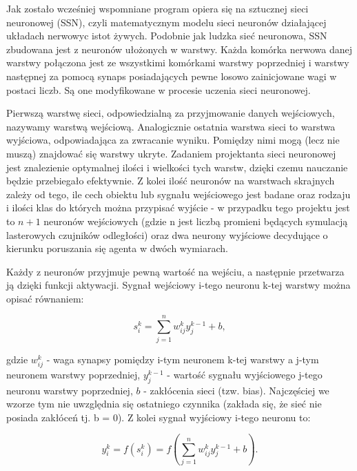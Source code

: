 \documentclass[12pt,a4paper]{article}
\begin{document}
\hspace{20pt} Jak zostało wcześniej wspomniane program opiera się na sztucznej sieci neuronowej (SSN), czyli matematycznym modelu sieci neuronów działającej układach nerwowyc istot żywych. Podobnie jak ludzka sieć neuronowa, SSN zbudowana jest z neuronów ułożonych w warstwy. Każda komórka nerwowa danej warstwy połączona jest ze wszystkimi komórkami warstwy poprzedniej i warstwy następnej za pomocą synaps posiadających pewne losowo zainicjowane wagi w postaci liczb. Są one modyfikowane w procesie uczenia sieci neuronowej.

\vspace{5pt}
Pierwszą warstwę sieci, odpowiedzialną za przyjmowanie danych wejściowych, nazywamy warstwą wejściową. Analogicznie ostatnia warstwa sieci to warstwa wyjściowa, odpowiadająca za zwracanie wyniku. Pomiędzy nimi mogą (lecz nie muszą) znajdować się warstwy ukryte. Zadaniem projektanta sieci neuronowej jest znalezienie optymalnej ilości i wielkości tych warstw, dzięki czemu nauczanie będzie przebiegało efektywnie. Z kolei ilość neuronów na warstwach skrajnych zależy od tego, ile cech obiektu lub sygnału wejściowego jest badane oraz rodzaju i ilości klas do których można przypisać wyjście - w przypadku tego projektu jest to $n+1$ neuronów wejściowych (gdzie n jest liczbą promieni będących symulacją lasterowych czujników odległości) oraz dwa neurony wyjściowe decydujące o kierunku poruszania się agenta w dwóch wymiarach.

\vspace{5pt}
Każdy z neuronów przyjmuje pewną wartość na wejściu, a następnie przetwarza ją dzięki funkcji aktywacji. Sygnał wejściowy i-tego neuronu k-tej warstwy można opisać równaniem:

\begin{equation*}
    s^k_i = \sum_{j=1}^{n}w^k_{ij} y^{k-1}_{j} + b,
\end{equation*}

\noindent gdzie $w^k_{ij}$ - waga synapsy pomiędzy i-tym neuronem k-tej warstwy a j-tym neuronem warstwy poprzedniej, $y^{k-1}_{j}$ - wartość sygnału wyjściowego j-tego neuronu warstwy poprzedniej, $b$ - zakłócenia sieci (tzw. bias). Najczęściej we wzorze tym nie uwzględnia się ostatniego czynnika (zakłada się, że sieć nie posiada zakłóceń tj. b = 0). Z kolei sygnał wyjściowy i-tego neuronu to:

\begin{equation*}
    y^k_i = f(s^k_i) = f(\sum_{j=1}^{n}w^k_{ij} y^{k-1}_{j} + b).
\end{equation*}
\end{document}
